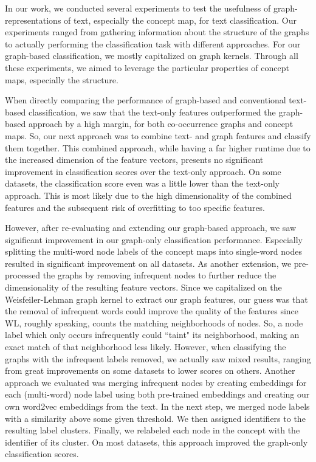 In our work, we conducted several experiments to test the usefulness of graph-representations of text, especially the concept map, for text classification.
Our experiments ranged from gathering information about the structure of the graphs to actually performing the classification task with different approaches.
For our graph-based classification, we mostly capitalized on graph kernels.
Through all these experiments, we aimed to leverage the particular properties of concept maps, especially the structure.

When directly comparing the performance of graph-based and conventional text-based classification, we saw that the text-only features outperformed the graph-based approach by a high margin, for both co-occurrence graphs and concept maps.
So, our next approach was to combine text- and graph features and classify them together.
This combined approach, while having a far higher runtime due to the increased dimension of the feature vectors, presents no significant improvement in classification scores over the text-only approach.
On some datasets, the classification score even was a little lower than the text-only approach.
This is most likely due to the high dimensionality of the combined features and the subsequent risk of overfitting to too specific features.

However, after re-evaluating and extending our graph-based approach, we saw significant improvement in our graph-only classification performance.
Especially splitting the multi-word node labels of the concept maps into single-word nodes resulted in significant improvement on all datasets.
As another extension, we pre-processed the graphs by removing infrequent nodes to further reduce the dimensionality of the resulting feature vectors.
Since we capitalized on the Weisfeiler-Lehman graph kernel to extract our graph features, our guess was that the removal of infrequent words could improve the quality of the features since WL, roughly speaking, counts the matching neighborhoods of nodes.
So, a node label which only occurs infrequently could ``taint" its neighborhood, making an exact match of that neighborhood less likely.
However, when classifying the graphs with the infrequent labels removed, we actually saw mixed results, ranging from great improvements on some datasets to lower scores on others.
Another approach we evaluated was merging infrequent nodes by creating embeddings for each (multi-word) node label using both pre-trained embeddings and creating our own word2vec embeddings from the text.
In the next step, we merged node labels with a similarity above some given threshold.
We then assigned identifiers to the resulting label clusters.
Finally, we relabeled each node in the concept with the identifier of its cluster.
On most datasets, this approach improved the graph-only classification scores.

